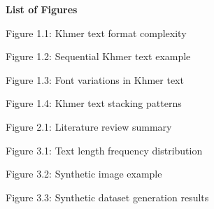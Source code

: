 \begin{adjustwidth}{0.2cm}{0.2cm}

    \begin{center}
        {\englishfont\fontsize{14pt}{21pt}\selectfont \textbf{List of Figures} \par}
    \end{center}
    \label{lof}

    \vspace{1cm}
    \setlength{\parindent}{0pt}
    \vspace{0.3cm}
    
    {\large Figure 1.1: Khmer text format complexity\dotfill\pageref{fig:text_format}\hspace{0.1cm}\par}
    
    {\large Figure 1.2: Sequential Khmer text example\dotfill\pageref{fig:sequential_text}\hspace{0.1cm}\par}
    
    {\large Figure 1.3: Font variations in Khmer text\dotfill\pageref{fig:font_variants}\hspace{0.1cm}\par}
    
    {\large Figure 1.4: Khmer text stacking patterns\dotfill\pageref{fig:text_stacking}\hspace{0.1cm}\par}
    
    {\large Figure 2.1: Literature review summary\dotfill\pageref{fig:summary_literature_review}\hspace{0.1cm}\par}
    
    {\large Figure 3.1: Text length frequency distribution\dotfill\pageref{fig:frequency_of_text_length}\hspace{0.1cm}\par}
    
    {\large Figure 3.2: Synthetic image example\dotfill\pageref{fig:synthetic-image}\hspace{0.1cm}\par}
    
    {\large Figure 3.3: Synthetic dataset generation results\dotfill\pageref{fig:result_synthetic_dataset}\hspace{0.1cm}\par}
    

\end{adjustwidth}
